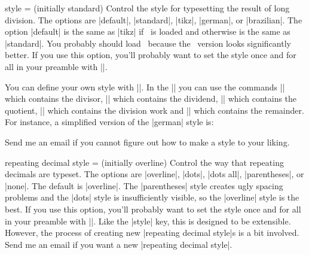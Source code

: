 \documentclass{ltxdoc}
\begin{document}
\begin{key}{style =  (initially standard)}
Control the style for typesetting the result of long division. The options
are |default|, |standard|, |tikz|, |german|, or |brazilian|. The option
|default| is the same as |tikz| if \tikzname\ is loaded and otherwise is the
same as |standard|. You probably should load \tikzname\ because the
\tikzname\ version looks significantly better. If you use this option,
you'll probably want to set the style once and for all in your preamble with
||.
\begin{tcblisting}{}
 \quad
{} \quad
{}
\end{tcblisting}
You can define your own style with |\longdivisiondefinestyle|.
In the || you can use the commands |\longdivdivisor| which contains the divisor, |\longdivdividend| which contains the dividend,
|\longdivquotient| which contains the quotient, |\longdivwork| which contains the division work
and |\longdivremainder| which contains the remainder.
For instance, a simplified version of the |german| style is:
\begin{tcblisting}{}
\end{tcblisting}
Send me an email if you cannot figure out how to make a style to your liking.
\end{key}

\begin{key}{repeating decimal style =  (initially overline)}
Control the way that repeating decimals are typeset. The options are |overline|, |dots|, |dots all|, |parentheses|, or |none|. The default is |overline|. The |parentheses| style creates ugly spacing problems and the |dots| style is insufficiently visible, so the |overline| style is the best. If you use this option, you'll probably want to set the style once and for all in your preamble with ||. Like the |style| key, this is designed to be extensible. However, the process of creating new |repeating decimal style|s is a bit involved. Send me an email if you want a new |repeating decimal style|.
\begin{tcblisting}{}
 \quad
{} \quad
{} \quad
{} \quad
{}
\end{tcblisting}
\end{key}
\end{document}
